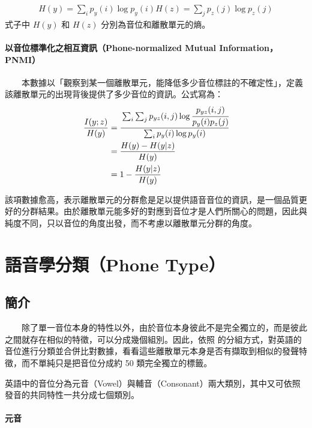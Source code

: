     \begin{align}
        H(y) = \sum_i{p_y(i)\log p_y(i)}
        H(z) = \sum_j{p_z(j)\log p_z(j)}
    \end{align}
式子中 $H(y)$ 和 $H(z)$ 分別為音位和離散單元的熵。

\paragraph{以音位標準化之相互資訊（Phone-normalized Mutual Information，PNMI）}

　　本數據以「觀察到某一個離散單元，能降低多少音位標註的不確定性」，定義該離散單元的出現背後提供了多少音位的資訊。公式寫為：
    \begin{align}
        \frac{I(y;z)}{H(y)}&=\cfrac{\sum_i \sum_j p_{yz}(i, j) \log \cfrac{p_{yz}(i, j)}{p_y(i)p_z(j)}}{\sum_i p_y(i) \log p_y(i)} \\
        &=\frac{H(y)-H(y|z)}{H(y)} \\
        &=1-\frac{H(y|z)}{H(y)}
    \end{align}

        該項數據愈高，表示離散單元的分群愈是足以提供語音音位的資訊，是一個品質更好的分群結果。由於離散單元能多好的對應到音位才是人們所關心的問題，因此與純度不同，只以音位的角度出發，而不考慮以離散單元分群的角度。

% 

\section{語音學分類（Phone Type）}

\subsection{簡介}

　　除了單一音位本身的特性以外，由於音位本身彼此不是完全獨立的，而是彼此之間就存在相似的特徵，可以分成幾個組別。因此，依照  的分組方式，對英語的音位進行分類並合併比對數據，看看這些離散單元本身是否有擷取到相似的發聲特徵，而不單純只是把音位分成約 50 類完全獨立的標籤。


        英語中的音位分為元音（Vowel）與輔音（Consonant）兩大類別，其中又可依照發音的共同特性一共分成七個類別。

\paragraph{元音}

